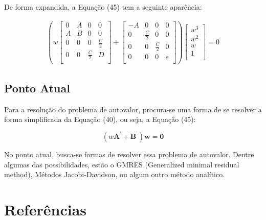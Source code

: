 \documentclass[a4paper,12p]{article}
\begin{document}
	De forma expandida, a Equação (45) tem a seguinte aparência:
	
	\begin{equation}
	\begin{gathered}
	\left(w 
	\begin{bmatrix}
	0&A&0&0 \\
	A&B&0&0 \\
	0&0&0&\frac{C}{2} \\
	0&0&\frac{C}{2}&D \\
	\end{bmatrix}
	+
	\begin{bmatrix}
	-A&0&0&0 \\
	0&\frac{C}{2}&0&0 \\
	0&0&\frac{C}{2}&0 \\
	0&0&0&e \\
	\end{bmatrix}\right)
	\begin{bmatrix}
	w^{3}\\
	w^{2}\\
	w\\
	1\\
	\end{bmatrix}
	=
	0
	\end{gathered}
	\end{equation}
	
	\subsection{Ponto Atual}
	Para a resolução do problema de autovalor, procura-se uma forma de se resolver a forma simplificada da Equação (40), ou seja, a Equação (45):
		
	\begin{equation}
	(w\textbf{A}^{\textbf{'}} 
	+ \textbf{B}^{\textbf{'}}){\textbf{w}} = \textbf{0}
	\end{equation}
	
	No ponto atual, busca-se formas de resolver essa problema de autovalor. Dentre algumas das possibilidades, estão o GMRES (Generalized minimal residual method), Métodos Jacobi-Davidson, ou algum outro método analítico.
	
	
	
	
	
	
	
	
	\pagebreak
	\section{Referências}
	
\end{document}

